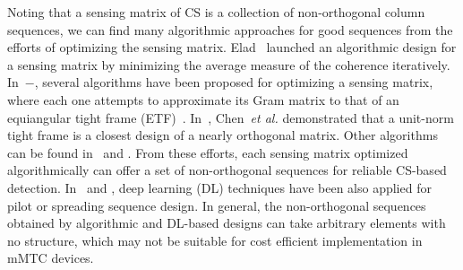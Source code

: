 \documentclass[journal]{IEEEtran}
\newcommand{\Abu}{{\bf A}}
\newcommand{\Ibu}{{\bf I}}
\newcommand{\Phibu}{{\bf \Phi}}
\numberwithin{const2}{const}
\begin{document}
Noting that a sensing matrix of CS is a collection of non-orthogonal column sequences,
we can find many algorithmic approaches %
for good sequences from the efforts of optimizing the sensing matrix.
Elad~\cite{Elad:opt} launched an algorithmic design for a sensing matrix
by minimizing the average measure of the coherence iteratively.
In~\cite{Xu:opt}$-$\cite{Zhang:opt}, several algorithms have been proposed for
optimizing a sensing matrix, %
where each one attempts to approximate %
its Gram matrix to that of an equiangular tight frame (ETF)~\cite{Kov:frames}. 
In~\cite{Chen:utf}, Chen~\emph{et al.} demonstrated that
a unit-norm tight frame is a closest design of a nearly orthogonal matrix. %
Other algorithms can be found in~\cite{Duarte:learn} and \cite{Lu:dir}. 
From these efforts, each sensing matrix optimized algorithmically can offer a set of 
non-orthogonal sequences %
for reliable CS-based detection.
In~\cite{Chun:DL} and \cite{Kim:DL}, 
deep learning (DL) techniques have been also applied for pilot or spreading sequence design. 
In general, the non-orthogonal sequences obtained by algorithmic and DL-based designs 
can take arbitrary elements with no structure,
which may not be suitable for cost efficient implementation in mMTC devices.
\end{document}
